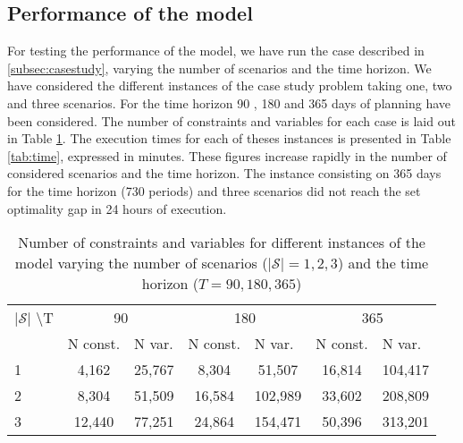 \subsection{Performance of the model}
For testing the performance of the model, we have run the case described in \ref{subsec:casestudy}, varying the number of scenarios and the time horizon. We have considered the different instances of the case study problem taking one, two and three scenarios. For the time horizon 90 , 180 and 365 days of planning have been considered. The number of constraints and variables for each case is laid out in Table \ref{tab:constnvar}. The execution times for each of theses instances is presented in Table \ref{tab:time}, expressed in minutes. These figures increase rapidly in the number of considered scenarios and the time horizon. The instance consisting on 365 days for the time horizon (730 periods) and three scenarios did not reach the set optimality gap in 24 hours of execution.

\begin{table}[h!]
\centering
\caption{Number of constraints and variables for different instances of the model varying the number of scenarios ($\left|\mathcal{S}\right|=1,2,3$) and the time horizon ($T=90,180,365$)}
\label{tab:constnvar}
\begin{tabular}{l|cccccc}
$\left|\mathcal{S}\right|$ \textbackslash T & \multicolumn{2}{c}{90}                                    & \multicolumn{2}{c}{180}                                   & \multicolumn{2}{c}{365}                                   \\
                                            & \multicolumn{1}{l}{N const.} & \multicolumn{1}{l}{N var.} & \multicolumn{1}{l}{N const.} & \multicolumn{1}{l}{N var.} & \multicolumn{1}{l}{N const.} & \multicolumn{1}{l}{N var.} \\ \hline
1                                           &  4,162                         & 25,767                      & 8,304                         & 51,507                      & 16,814                        &  104,417                     \\
2                                           &  8,304                         & 51,509                      & 16,584                        &  102,989                     & 33,602                        &  208,809                     \\
3                                           & 12,440                        & 77,251                      & 24,864                        &  154,471                     & 50,396                        & 313,201                    
\end{tabular}
\end{table}



